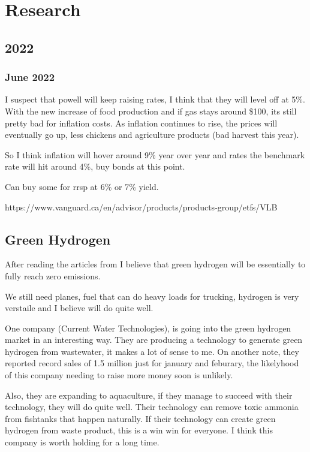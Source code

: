 \chapter{Research}


\section{2022}

\subsection{June 2022}

I suspect that powell will keep raising rates, I think that they will level off at 5\%. With the new increase of food production and if gas stays around \$100, its still pretty bad for inflation costs. As inflation continues to rise, the prices will eventually go up, less chickens and agriculture products (bad harvest this year).

So I think inflation will hover around 9\% year over year and rates the benchmark rate will hit around 4\%, buy bonds at this point.

Can buy some for rrsp at 6\% or 7\% yield.

https://www.vanguard.ca/en/advisor/products/products-group/etfs/VLB

\section{Green Hydrogen}
After reading the articles from \cite{goldman_sachs_hydrogen_2022} I believe that green hydrogen will be essentially to fully reach zero emissions.

We still need planes, fuel that can do heavy loads for trucking, hydrogen is very verstaile and I believe will do quite well.

One company  (Current Water Technologies), is going into the green hydrogen market in an interesting way. They are producing a technology to generate green hydrogen from wastewater, it makes a lot of sense to me. On another note, they reported record sales of 1.5 million just for january and feburary, the likelyhood of this company needing to raise more money soon is unlikely.

Also, they are expanding to aquaculture, if they manage to succeed with their technology, they will do quite well. Their technology can remove toxic ammonia from fishtanks that happen naturally. If their technology can create green hydrogen from waste product, this is a win win for everyone. I think this company is worth holding for a long time.


